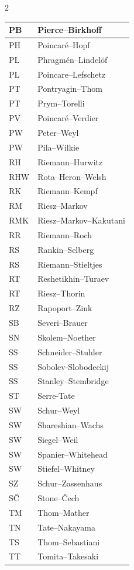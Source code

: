 \documentclass{amsart}
\numberwithin{equation}{section}
\theoremstyle{plain}
\numberwithin{equation}{section}
\theoremstyle{remark}
\begin{document}
\begin{multicols}{2}
{\begin{longtable}{l|l}
PB & Pierce--Birkhoff\\ \hline
PH & Poincaré--Hopf\\ \hline
PL & Phragmén--Lindelöf\\ \hline
PL & Poincare--Lefschetz\\ \hline
PT & Pontryagin--Thom\\ \hline
PT & Prym--Torelli\\ \hline
PV & Poincaré--Verdier\\ \hline
PW & Peter--Weyl\\ \hline
PW & Pila--Wilkie\\ \hline
RH & Riemann--Hurwitz\\ \hline
RHW & Rota--Heron--Welsh\\ \hline
RK & Riemann--Kempf\\ \hline
RM & Riesz--Markov\\ \hline
RMK & Riesz--Markov--Kakutani\\ \hline
RR & Riemann--Roch\\ \hline
RS & Rankin--Selberg\\ \hline
RS & Riemann--Stieltjes\\ \hline
RT & Reshetikhin--Turaev\\ \hline
RT & Riesz--Thorin\\ \hline
RZ & Rapoport--Zink\\ \hline
SB & Severi--Brauer\\ \hline
SN & Skolem--Noether\\ \hline
SS & Schneider--Stuhler\\ \hline
SS & Sobolev-Slobodeckij\\ \hline
SS & Stanley--Stembridge\\ \hline
ST & Serre-Tate\\ \hline
SW & Schur--Weyl\\ \hline
SW & Shareshian--Wachs\\ \hline
SW & Siegel--Weil\\ \hline
SW & Spanier--Whitehead\\ \hline
SW & Stiefel--Whitney\\ \hline
SZ & Schur--Zassenhaus\\ \hline
SČ & Stone--Čech\\ \hline
TM & Thom--Mather\\ \hline
TN & Tate--Nakayama\\ \hline
TS & Thom--Sebastiani\\ \hline
TT & Tomita--Takesaki\\ \hline

\end{longtable}}
\end{multicols}
\end{document}
